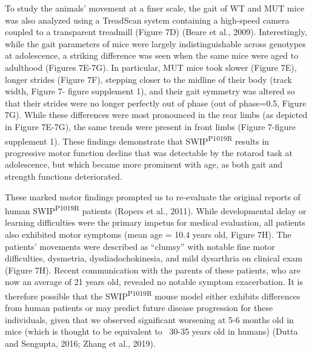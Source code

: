 To study the animals’ movement at a finer scale, the gait of WT and MUT mice was
also analyzed using a TreadScan system containing a high-speed camera coupled to
a transparent treadmill (Figure 7D) (Beare et al., 2009). Interestingly, while
the gait parameters of mice were largely indistinguishable across genotypes at
adolescence, a striking difference was seen when the same mice were aged to
adulthood (Figures 7E-7G). In particular, MUT mice took slower (Figure 7E),
longer strides (Figure 7F), stepping closer to the midline of their body (track
width, Figure 7- figure supplement 1), and their gait symmetry was altered so
that their strides were no longer perfectly out of phase (out of phase=0.5,
Figure 7G). While these differences were most pronounced in the rear limbs (as
depicted in Figure 7E-7G), the same trends were present in front limbs (Figure
7-figure supplement 1). These findings demonstrate that SWIP\textsuperscript{P1019R} results in
progressive motor function decline that was detectable by the rotarod task at
adolescence, but which became more prominent with age, as both gait and strength
functions deteriorated.

These marked motor findings prompted us to re-evaluate the original reports of
human SWIP\textsuperscript{P1019R} patients (Ropers et al., 2011). While developmental delay or
learning difficulties were the primary impetus for medical evaluation, all
patients also exhibited motor symptoms (mean age = 10.4 years old, Figure 7H).
The patients’ movements were described as “clumsy” with notable fine motor
difficulties, dysmetria, dysdiadochokinesia, and mild dysarthria on clinical
exam (Figure 7H). Recent communication with the parents of these patients, who
are now an average of 21 years old, revealed no notable symptom exacerbation. It
is therefore possible that the SWIP\textsuperscript{P1019R} mouse model either exhibits
differences from human patients or may predict future disease progression for
these individuals, given that we observed significant worsening at 5-6 months
old in mice (which is thought to be equivalent to ~30-35 years old in humans)
(Dutta and Sengupta, 2016; Zhang et al., 2019).


